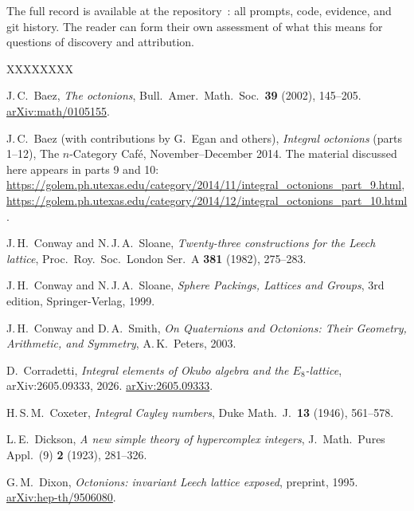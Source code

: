 \documentclass[twoside,english]{paper}
\numberwithin{equation}{section}
\numberwithin{figure}{section}
\theoremstyle{definition}
\theoremstyle{remark}
\begin{document}
The full record is available at the repository~\cite{repo}: all
prompts, code, evidence, and git history.  The reader can form
their own assessment of what this means for questions of discovery
and attribution.


\begin{thebibliography}{XXXXXXXX}

J.\,C.~Baez,
\emph{The octonions},
Bull.\ Amer.\ Math.\ Soc.\ \textbf{39} (2002), 145--205.
\href{https://arxiv.org/abs/math/0105155}{arXiv:math/0105155}.

J.\,C.~Baez (with contributions by G.~Egan and others),
\emph{Integral octonions} (parts 1--12),
The $n$-Category Caf\'e, November--December 2014.
The material discussed here appears in parts 9 and 10:
\url{https://golem.ph.utexas.edu/category/2014/11/integral_octonions_part_9.html},
\url{https://golem.ph.utexas.edu/category/2014/12/integral_octonions_part_10.html}.

J.\,H.~Conway and N.\,J.\,A.~Sloane,
\emph{Twenty-three constructions for the Leech lattice},
Proc.\ Roy.\ Soc.\ London Ser.\ A \textbf{381} (1982), 275--283.

J.\,H.~Conway and N.\,J.\,A.~Sloane,
\emph{Sphere Packings, Lattices and Groups},
3rd edition, Springer-Verlag, 1999.

J.\,H.~Conway and D.\,A.~Smith,
\emph{On Quaternions and Octonions: Their Geometry, Arithmetic, and
Symmetry},
A.\,K.~Peters, 2003.

D.~Corradetti,
\emph{Integral elements of Okubo algebra and the $E_8$-lattice},
arXiv:2605.09333, 2026.
\href{https://arxiv.org/abs/2605.09333}{arXiv:2605.09333}.

H.\,S.\,M.~Coxeter,
\emph{Integral Cayley numbers},
Duke Math.\ J.\ \textbf{13} (1946), 561--578.

L.\,E.~Dickson,
\emph{A new simple theory of hypercomplex integers},
J.~Math.\ Pures Appl.\ (9) \textbf{2} (1923), 281--326.

G.\,M.~Dixon,
\emph{Octonions: invariant Leech lattice exposed},
preprint, 1995.
\href{https://arxiv.org/abs/hep-th/9506080}{arXiv:hep-th/9506080}.


\end{thebibliography}
\end{document}
